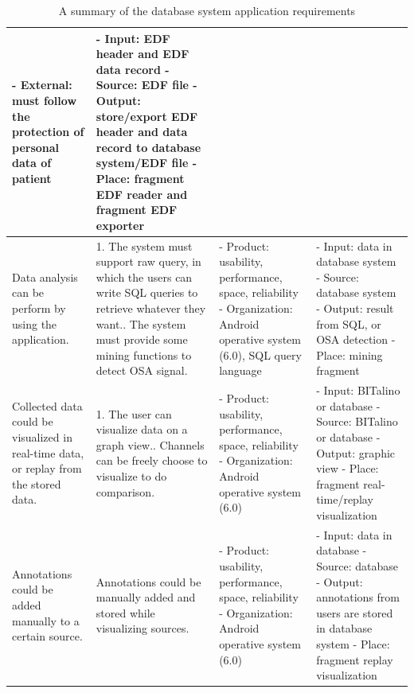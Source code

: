 \begin{table}
\begin{adjustwidth}{-1.2cm}{}
\begin{tabular}{ |p{2.4cm}|p{5.6cm}|p{3.2cm}|p{4.3cm}|}
 - External: must follow the protection of personal data of patient&
 - Input: EDF header and EDF data record\newline
 - Source: EDF file\newline
 - Output: store/export EDF header and data record to database system/EDF file\newline
 - Place: fragment EDF reader and fragment EDF exporter\\
 \hline
 Data analysis can be perform by using the application.&
 1. The system must support raw query, in which the users can write SQL queries to retrieve whatever they want.\newline
 2. The system must provide some mining functions to detect OSA signal.&
 - Product: usability, performance, space, reliability\newline
 - Organization: Android operative system (6.0), SQL query language&
 - Input: data in database system\newline
 - Source: database system\newline
 - Output: result from SQL, or OSA detection\newline
 - Place: mining fragment\\
 \hline
 Collected data could be visualized in real-time data, or replay from the stored data.&
 1. The user can visualize data on a graph view.\newline
 2. Channels can be freely choose to visualize to do comparison.&
 - Product: usability, performance, space, reliability\newline
 - Organization: Android operative system (6.0)&
 - Input: BITalino or database\newline
 - Source: BITalino or database\newline
 - Output: graphic view\newline
 - Place: fragment real-time/replay visualization\\
 \hline
 Annotations could be added manually to a certain source.&
 Annotations could be manually added and stored while visualizing sources.&
 - Product: usability, performance, space, reliability\newline
 - Organization: Android operative system (6.0)&
 - Input: data in database\newline
 - Source: database\newline
 - Output: annotations from users are stored in database system\newline
 - Place: fragment replay visualization\\
 \hline
\end{tabular}
\end{adjustwidth}
\caption{A summary of the database system application requirements}
\label{tab:userrequirementAPP}
\end{table}
